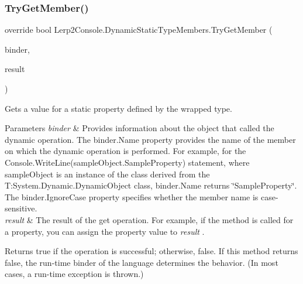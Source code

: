 \subsubsection{\texorpdfstring{Try\+Get\+Member()}{TryGetMember()}}
{\footnotesize\ttfamily override bool Lerp2\+Console.\+Dynamic\+Static\+Type\+Members.\+Try\+Get\+Member (\begin{DoxyParamCaption}\item[{Get\+Member\+Binder}]{binder,  }\item[{out object}]{result }\end{DoxyParamCaption})\hspace{0.3cm}{\ttfamily [inline]}}



Gets a value for a static property defined by the wrapped type. 


\begin{DoxyParams}{Parameters}
{\em binder} & Provides information about the object that called the dynamic operation. The binder.\+Name property provides the name of the member on which the dynamic operation is performed. For example, for the Console.\+Write\+Line(sample\+Object.\+Sample\+Property) statement, where sample\+Object is an instance of the class derived from the T\+:\+System.\+Dynamic.\+Dynamic\+Object class, binder.\+Name returns \char`\"{}\+Sample\+Property\char`\"{}. The binder.\+Ignore\+Case property specifies whether the member name is case-\/sensitive.\\
\hline
{\em result} & The result of the get operation. For example, if the method is called for a property, you can assign the property value to {\itshape result} .\\
\hline
\end{DoxyParams}
\begin{DoxyReturn}{Returns}
true if the operation is successful; otherwise, false. If this method returns false, the run-\/time binder of the language determines the behavior. (In most cases, a run-\/time exception is thrown.) 
\end{DoxyReturn}
\mbox{\label{class_lerp2_console_1_1_dynamic_static_type_members_a80c9ae20785234345637299aba800f2a}} 

